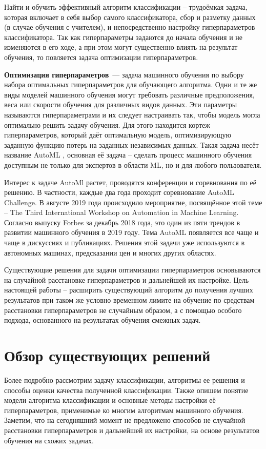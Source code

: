 \documentclass[times,specification,annotation]{itmo-student-thesis}
\begin{document}
	Найти и обучить эффективный алгоритм классификации -- трудоёмкая задача, которая включает в себя выбор самого классификатора, сбор и разметку данных (в случае обучения с учителем), и непосредственно настройку гиперпараметров классификатора. Так как гиперпараметры задаются до начала обучения и не изменяются в его ходе, а при этом могут существенно влиять на результат обучения, то повляется задача оптимизации гиперпараметров. \par
	

	\textbf{Оптимизация гиперпараметров} — задача машинного обучения по выбору набора оптимальных гиперпараметров для обучающего алгоритма. Одни и те же виды моделей машинного обучения могут требовать различные предположения, веса или скорости обучения для различных видов данных. Эти параметры называются гиперпараметрами и их следует настраивать так, чтобы модель могла оптимально решить задачу обучения. Для этого находится кортеж гиперпараметров, который даёт оптимальную модель, оптимизирующую заданную функцию потерь на заданных независимых данных. Такая задача несёт название AutoML \cite{feurer-automlbook19a}, основная её задача -- сделать процесс машинного обучения доступным не только для экспертов в области ML, но и для любого пользователя. 
	
	Интерес к задаче AutoMl растет, проводятся конференции и соревнования по её решению. В частности, каждые два года проходит соревнование AutoML Challenge. В августе 2019 года происходило мероприятие, посвящённое этой теме -- The Third International Workshop on Automation in Machine Learning. Согласно выпуску Forbes за декабрь 2018 года, это один из пяти трендов в развитии машинного обучения в 2019 году. Тема AutoML появляется все чаще и чаще в дискуссиях и публикациях. Решения этой задачи уже используются в автономных машинах, предсказании цен и многих других областях.
	
	Существующие решения \cite{lindauer2017warmstarting, HutHooLey10-TR, NIPS2015_5872, falkner-icml-18} для задачи оптимизации гиперпараметров основываются на случайной расстановке гиперпараметров и дальнейшей их настройке. Цель настоящей работы -- расширить существующий алгоритм до получения лучших результатов при таком же условно временном лимите на обучение по средствам расстановки гиперпараметров не случайным образом, а с помощью особого подхода, основанного на результатах обучения смежных задач.\par

	
	\chapter{Обзор существующих решений}\label{chp1}
	Более подробно рассмотрим задачу классификации, алгоритмы ее решения и способы оценки качества полученной классификации. Также опишем понятие модели алгоритма классификации и основные методы настройки её гиперпараметров, применимые ко многим алгоритмам машинного обучения.
	Заметим, что на сегодняшний момент не предложено способов не случайной расстановки гиперпараметров и дальнейшей их настройки, на основе результатов обучения на схожих задачах.
	\startrelatedwork
	
\end{document}
